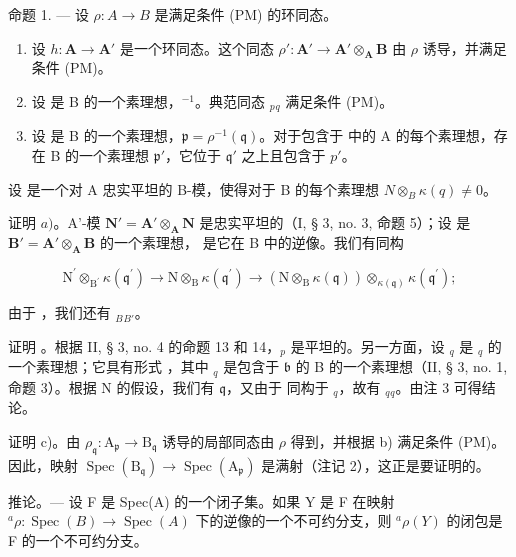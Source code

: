 命题 1. --- 设 \(\rho: A \to B\) 是满足条件 (PM) 的环同态。

\begin{enumerate}
\def\labelenumi{\alph{enumi})}
\item
  设 \(h: \mathbf{A} \to \mathbf{A}'\) 是一个环同态。这个同态 \(\rho': \mathbf{A}' \to \mathbf{A}' \otimes_{\mathbf{A}} \mathbf{B}\) 由 \(\rho\) 诱导，并满足条件 (PM)。
\item
  设  是 B 的一个素理想，\(^{-1}\)。典范同态 \(_{p}\)\(_{q}\) 满足条件 (PM)。
\item
设  是 B 的一个素理想，\(\mathfrak{p} = \rho^{-1}(\mathfrak{q})\)。对于包含于  中的 A 的每个素理想，存在 B 的一个素理想 \(\mathfrak{p}'\)，它位于 \(\mathfrak{q}'\) 之上且包含于 \(p'\)。
\end{enumerate}

设  是一个对 A 忠实平坦的 B-模，使得对于 B 的每个素理想 \(N \otimes_{B} \kappa(q) \neq 0\)。

证明 \(a)\)。A'-模 \(\mathbf{N}' = \mathbf{A}' \otimes_{\mathbf{A}} \mathbf{N}\) 是忠实平坦的（I, § 3, no. 3, 命题 5）；设  是 \(\mathbf{B}' = \mathbf{A}' \otimes_{\mathbf{A}} \mathbf{B}\) 的一个素理想， 是它在 B 中的逆像。我们有同构

\[
\mathrm{N} ^ {\prime} \otimes_ {\mathrm{B} ^ {\prime}} \kappa (\mathfrak {q} ^ {\prime}) \rightarrow \mathrm{N} \otimes_ {\mathrm{B}} \kappa (\mathfrak {q} ^ {\prime}) \rightarrow (\mathrm{N} \otimes_ {\mathrm{B}} \kappa (\mathfrak {q})) \otimes_ {\kappa (\mathfrak {q})} \kappa (\mathfrak {q} ^ {\prime});
\]

由于  ，我们还有 \(_{B}\)\(_{B'}\)。

证明  。根据 II, § 3, no. 4 的命题 13 和 14，\(_{p}\) 是平坦的。另一方面，设 \(_{q}\) 是 \(_{q}\) 的一个素理想；它具有形式  ，其中 \(_{q}\) 是包含于 \(\mathfrak{b}\) 的 B 的一个素理想（II, § 3, no. 1, 命题 3）。根据 N 的假设，我们有 \(\mathfrak{q}\)，又由于  同构于 \(_{q}\)，故有 \(_{q}\)\(_{q}\)。由注 3 可得结论。

证明 c)。由 \(\rho_{\mathfrak{q}}: \mathrm{A}_{\mathfrak{p}} \to \mathrm{B}_{\mathfrak{q}}\) 诱导的局部同态由 \(\rho\) 得到，并根据 b) 满足条件 (PM)。因此，映射 \(\operatorname{Spec}(\mathrm{B}_{\mathfrak{q}}) \to \operatorname{Spec}(\mathrm{A}_{\mathfrak{p}})\) 是满射（注记 2），这正是要证明的。

推论。--- 设 F 是 Spec(A) 的一个闭子集。如果 Y 是 F 在映射 \(^{a}\rho : \operatorname{Spec}(B) \to \operatorname{Spec}(A)\) 下的逆像的一个不可约分支，则 \(^{a}\rho(Y)\) 的闭包是 F 的一个不可约分支。

